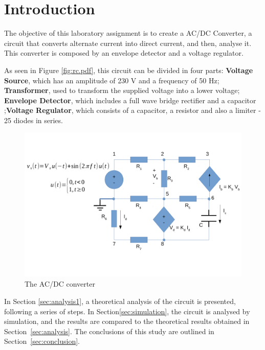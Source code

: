 \section{Introduction}
\label{sec:introduction}

The objective of this laboratory assignment is to create a AC/DC Converter, a circuit that converts alternate current into direct current, and then, analyse it. This converter is composed by an envelope detector and a voltage regulator.

As seen in Figure \ref{fig:rc.pdf}, this circuit can be divided in four parts: \textbf{Voltage Source}, which has an amplitude of 230 V and a frequency of 50 Hz; \textbf{Transformer}, used to transform the supplied voltage into a lower voltage; \textbf{Envelope Detector}, which includes a full wave bridge rectifier and a capacitor ;\textbf{Voltage Regulator}, which consists of a capacitor, a resistor and also a limiter - 25 diodes in series.

\begin{figure}[h] \centering
\includegraphics[width=0.99\linewidth]{rc.pdf}
\vspace{-5mm}
\caption{The AC/DC converter}
\label{fig:rc}
\end{figure}

In Section \ref{sec:analysis1}, a theoretical analysis of the circuit is
presented, following a series of steps. In Section\ref{sec:simulation}, the circuit is analysed by
simulation, and the results are compared to the theoretical results obtained in
Section~\ref{sec:analysis}. The conclusions of this study are outlined in
Section~\ref{sec:conclusion}.





